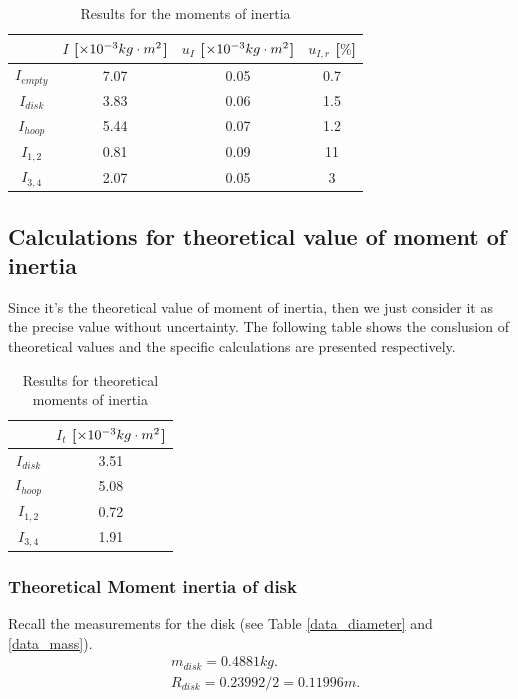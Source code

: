     \begin{table}[H] \small
        \centering
        \begin{tabular}{|c|c|c|c|}
            \hline
            & $I$ [$\times10^{-3}kg\cdot m^2$] & $u_I$ [$\times10^{-3}kg\cdot m^2$] & $u_{I,r}$ [$\%$]\\\hline
            $I_{empty}$ & 7.07 & 0.05 & 0.7\\\hline
            $I_{disk}$ & 3.83 & 0.06 & 1.5\\\hline
            $I_{hoop}$ & 5.44 & 0.07 & 1.2\\\hline
            $I_{1,2}$ & 0.81 & 0.09 & 11\\\hline
            $I_{3,4}$ & 2.07 & 0.05 & 3\\\hline
        \end{tabular}
        \caption{Results for the moments of inertia}\label{data_i}
    \end{table}

\subsection{Calculations for theoretical value of moment of inertia}
    Since it's the theoretical value of moment of inertia, then we just consider it as the precise value without uncertainty. The following table shows the conslusion of theoretical values and the specific calculations are presented respectively.
    \begin{table}[H] \small
        \centering
        \begin{tabular}{|c|c|}
            \hline
            & $I_t$ [$\times10^{-3}kg\cdot m^2$]\\\hline
            $I_{disk}$ & 3.51\\\hline
            $I_{hoop}$ & 5.08\\\hline
            $I_{1,2}$ & 0.72\\\hline
            $I_{3,4}$ & 1.91\\\hline
        \end{tabular}
        \caption{Results for theoretical moments of inertia}\label{data_i}
    \end{table}
\subsubsection{Theoretical Moment inertia of disk}
    Recall the measurements for the disk (see Table \ref{data_diameter} and \ref{data_mass}).
    \[
    \begin{split}
        &m_{disk}=0.4881kg.\\
        &R_{disk}=0.23992/2=0.11996m.\\
    \end{split}
    \]

